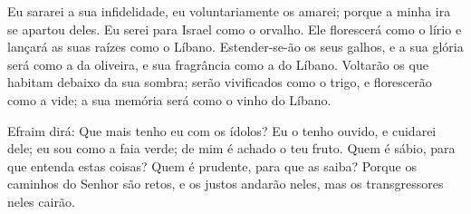 Eu sararei a sua infidelidade, eu voluntariamente os amarei;
porque a minha ira se apartou deles. Eu serei para Israel como o
orvalho. Ele florescerá como o lírio e lançará as suas raízes como o
Líbano. Estender-se-ão os seus galhos, e a sua glória será como
a da oliveira, e sua fragrância como a do Líbano. Voltarão os
que habitam debaixo da sua sombra; serão vivificados como o trigo, e
florescerão como a vide; a sua memória será como o vinho do Líbano.

Efraim dirá: Que mais tenho eu com os ídolos? Eu o tenho ouvido, e
cuidarei dele; eu sou como a faia verde; de mim é achado o teu
fruto. Quem é sábio, para que entenda estas coisas? Quem é
prudente, para que as saiba? Porque os caminhos do Senhor são retos,
e os justos andarão neles, mas os transgressores neles cairão.

